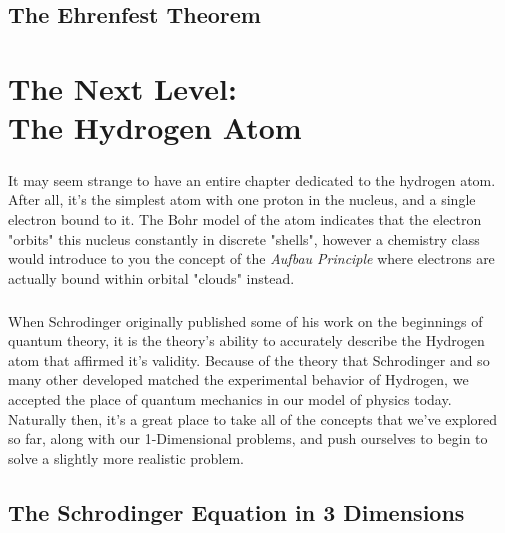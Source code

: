 \documentclass[12pt,letterpaper]{book}
\begin{document}

\section{The Ehrenfest Theorem}



\chapter{The Next Level: \\ The Hydrogen Atom}
\paragraph*{}It may seem strange to have an entire chapter dedicated to the hydrogen atom. After all, it's the simplest atom with one proton in the nucleus, and a single electron bound to it. The Bohr model of the atom indicates that the electron "orbits" this nucleus constantly in discrete "shells", however a chemistry class would introduce to you the concept of the \textit{Aufbau Principle} where electrons are actually bound within orbital "clouds" instead.
\paragraph*{}When Schrodinger originally published some of his work on the beginnings of quantum theory, it is the theory's ability to accurately describe the Hydrogen atom that affirmed it's validity. Because of the theory that Schrodinger and so many other developed matched the experimental behavior of Hydrogen, we accepted the place of quantum mechanics in our model of physics today. Naturally then, it's a great place to take all of the concepts that we've explored so far, along with our 1-Dimensional problems, and push ourselves to begin to solve a slightly more realistic problem. 


\section{The Schrodinger Equation in 3 Dimensions}
\end{document}
